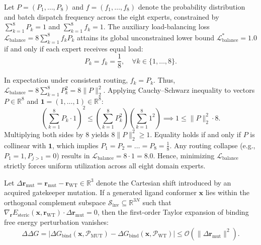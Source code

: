 \begin{proposition}
\label{prop:moe_balance}
Let $P = (P_1, \dots, P_8)$ and $f = (f_1, \dots, f_8)$ denote the probability distribution and batch dispatch frequency across the eight experts, constrained by $\sum_{k=1}^8 P_k = 1$ and $\sum_{k=1}^8 f_k = 1$. The auxiliary load-balancing loss $\mathcal{L}_{\text{balance}} = 8 \sum_{k=1}^8 f_k P_k$ attains its global unconstrained lower bound $\mathcal{L}_{\text{balance}}^* = 1.0$ if and only if each expert receives equal load:
\begin{equation}
P_k = f_k = \frac{1}{8}, \quad \forall k \in \{1, \dots, 8\}.
\end{equation}
\end{proposition}

\begin{IEEEproof}
In expectation under consistent routing, $f_k = P_k$. Thus, $\mathcal{L}_{\text{balance}} = 8 \sum_{k=1}^8 P_k^2 = 8 \|P\|_2^2$. Applying Cauchy--Schwarz inequality to vectors $P \in \mathbb{R}^8$ and $\mathbf{1} = (1, \dots, 1) \in \mathbb{R}^8$:
\begin{equation*}
\left( \sum_{k=1}^8 P_k \cdot 1 \right)^2 \le \left( \sum_{k=1}^8 P_k^2 \right) \left( \sum_{k=1}^8 1^2 \right) \implies 1 \le \|P\|_2^2 \cdot 8.
\end{equation*}
Multiplying both sides by 8 yields $8 \|P\|_2^2 \ge 1$. Equality holds if and only if $P$ is collinear with $\mathbf{1}$, which implies $P_1 = P_2 = \dots = P_8 = \frac{1}{8}$. Any routing collapse (e.g., $P_1 = 1, P_{j > 1} = 0$) results in $\mathcal{L}_{\text{balance}} = 8 \cdot 1 = 8.0$. Hence, minimizing $\mathcal{L}_{\text{balance}}$ strictly forces uniform utilization across all eight domain experts.
\end{IEEEproof}

\begin{proposition}
\label{prop:resistance_invariance}
Let $\Delta \mathbf{r}_{\text{mut}} = \mathbf{r}_{\text{mut}} - \mathbf{r}_{\text{WT}} \in \mathbb{R}^3$ denote the Cartesian shift introduced by an acquired gatekeeper mutation. If a generated ligand conformer $\mathbf{x}$ lies within the orthogonal complement subspace $\mathcal{S}_{\text{inv}} \subseteq \mathbb{R}^{3N}$ such that $\nabla_{\mathbf{r}} E_{\text{steric}}(\mathbf{x}, \mathbf{r}_{\text{WT}}) \cdot \Delta \mathbf{r}_{\text{mut}} = 0$, then the first-order Taylor expansion of binding free energy perturbation vanishes:
\begin{equation}
\Delta \Delta G = |\Delta G_{\text{bind}}(\mathbf{x}, \mathcal{P}_{\text{MUT}}) - \Delta G_{\text{bind}}(\mathbf{x}, \mathcal{P}_{\text{WT}})| \le \mathcal{O}(\|\Delta \mathbf{r}_{\text{mut}}\|^2).
\end{equation}
\end{proposition}

